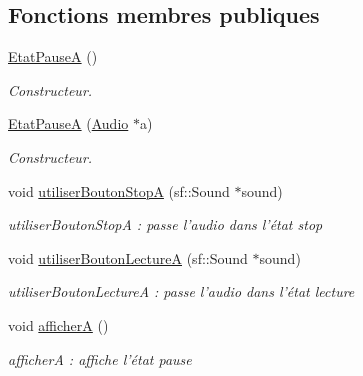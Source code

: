\subsection*{Fonctions membres publiques}
\begin{DoxyCompactItemize}
\item 
\hypertarget{classEtatPauseA_a2980943694ceb3f46af2ef813a9a2921}{\hyperlink{classEtatPauseA_a2980943694ceb3f46af2ef813a9a2921}{Etat\+Pause\+A} ()}\label{classEtatPauseA_a2980943694ceb3f46af2ef813a9a2921}

\begin{DoxyCompactList}\small\item\em Constructeur. \end{DoxyCompactList}\item 
\hyperlink{classEtatPauseA_a76a16c20d023e39e72022076c768350d}{Etat\+Pause\+A} (\hyperlink{classAudio}{Audio} $\ast$a)
\begin{DoxyCompactList}\small\item\em Constructeur. \end{DoxyCompactList}\item 
\hypertarget{classEtatPauseA_ae5b24db5e5dac2e537d15e8f06cb6031}{void \hyperlink{classEtatPauseA_ae5b24db5e5dac2e537d15e8f06cb6031}{utiliser\+Bouton\+Stop\+A} (sf\+::\+Sound $\ast$sound)}\label{classEtatPauseA_ae5b24db5e5dac2e537d15e8f06cb6031}

\begin{DoxyCompactList}\small\item\em utiliser\+Bouton\+Stop\+A \+: passe l'audio dans l'état stop \end{DoxyCompactList}\item 
\hypertarget{classEtatPauseA_ade87301319d07c8a39650d520420d1c0}{void \hyperlink{classEtatPauseA_ade87301319d07c8a39650d520420d1c0}{utiliser\+Bouton\+Lecture\+A} (sf\+::\+Sound $\ast$sound)}\label{classEtatPauseA_ade87301319d07c8a39650d520420d1c0}

\begin{DoxyCompactList}\small\item\em utiliser\+Bouton\+Lecture\+A \+: passe l'audio dans l'état lecture \end{DoxyCompactList}\item 
\hypertarget{classEtatPauseA_a0fc6595ed30426469fd65fb53f732a2c}{void \hyperlink{classEtatPauseA_a0fc6595ed30426469fd65fb53f732a2c}{afficher\+A} ()}\label{classEtatPauseA_a0fc6595ed30426469fd65fb53f732a2c}

\begin{DoxyCompactList}\small\item\em afficher\+A \+: affiche l'état pause \end{DoxyCompactList}\end{DoxyCompactItemize}


